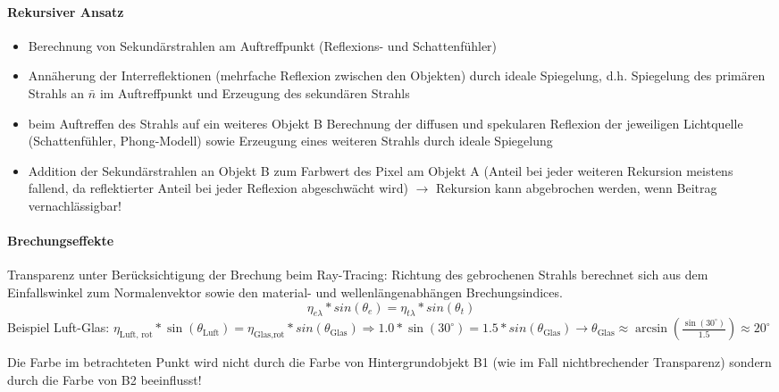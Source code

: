 \documentclass[10pt,landscape]{article}
\begin{document}
\begin{multicols}{3}
{  
  \paragraph{Rekursiver Ansatz}
  \begin{itemize}
    \item Berechnung von Sekundärstrahlen am Auftreffpunkt (Reflexions- und Schattenfühler)
    \item Annäherung der Interreflektionen (mehrfache Reflexion zwischen den Objekten) durch ideale Spiegelung, d.h. Spiegelung des primären Strahls an $\bar{n}$ im Auftreffpunkt und Erzeugung des sekundären Strahls
    \item beim Auftreffen des Strahls auf ein weiteres Objekt B Berechnung der diffusen und spekularen Reflexion der jeweiligen Lichtquelle (Schattenfühler, Phong-Modell) sowie Erzeugung eines weiteren Strahls durch ideale Spiegelung
    \item Addition der Sekundärstrahlen an Objekt B zum Farbwert des Pixel am Objekt A (Anteil bei jeder weiteren Rekursion meistens fallend, da reflektierter Anteil bei jeder Reflexion abgeschwächt wird) $\rightarrow$ Rekursion kann abgebrochen werden, wenn Beitrag vernachlässigbar!
  \end{itemize}
  
  
  \paragraph{Brechungseffekte}
  Transparenz unter Berücksichtigung der Brechung beim Ray-Tracing: Richtung des gebrochenen Strahls berechnet sich aus dem Einfallswinkel zum Normalenvektor sowie den material- und wellenlängenabhängen Brechungsindices.
  $$\eta_{e\lambda}*sin(\theta_e) = \eta_{t\lambda}*sin(\theta_t)$$
  Beispiel Luft-Glas: $\eta_{\text{Luft, rot}}*\sin(\theta_{\text{Luft}})=\eta_{\text{Glas,rot}}*sin(\theta_{\text{Glas}}) \Rightarrow 1.0*\sin(30^\circ)=1.5*sin(\theta_{\text{Glas}})\rightarrow \theta_{\text{Glas}} \approx \arcsin(\frac{\sin(30^\circ)}{1.5})\approx 20^\circ$
  
  Die Farbe im betrachteten Punkt wird nicht durch die Farbe von Hintergrundobjekt B1 (wie im Fall nichtbrechender Transparenz) sondern durch die Farbe von B2 beeinflusst!
  
}
\end{multicols}
\end{document}
